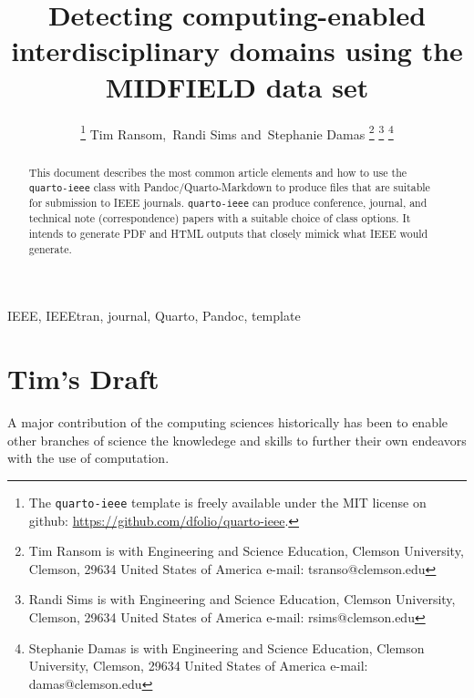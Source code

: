 \documentclass[
  journal,
]{IEEEtran}%
\title{Detecting computing-enabled interdisciplinary domains using the
MIDFIELD data set}
\author{
\thanks{The \texttt{quarto-ieee} template is freely available under the
MIT license on github: \url{https://github.com/dfolio/quarto-ieee}.}
Tim Ransom\orcidlink{0000-0003-0357-5427},~Randi
Sims\orcidlink{0000-0003-0357-5427}
and~Stephanie Damas\orcidlink{0000-0003-0357-5427}%
\thanks{Tim Ransom is with Engineering and Science Education, Clemson
University, Clemson, 29634 United States of America%
 e-mail: tsranso@clemson.edu}
\thanks{Randi Sims is with Engineering and Science Education, Clemson
University, Clemson, 29634 United States of America%
 e-mail: rsims@clemson.edu}
\thanks{Stephanie Damas is with Engineering and Science
Education, Clemson University, Clemson, 29634 United States of America%
 e-mail: damas@clemson.edu}
}
\begin{document}


\maketitle

\begin{abstract}
This document describes the most common article elements and how to use
the \texttt{quarto-ieee} class with Pandoc/Quarto-Markdown to produce
files that are suitable for submission to IEEE journals.
\texttt{quarto-ieee} can produce conference, journal, and technical note
(correspondence) papers with a suitable choice of class options. It
intends to generate PDF and HTML outputs that closely mimick what IEEE
would generate.
\end{abstract}
\begin{IEEEkeywords}
IEEE, IEEEtran, journal, Quarto, Pandoc, template
\end{IEEEkeywords}

%

\ifdefined\Shaded\renewenvironment{Shaded}{\begin{tcolorbox}[enhanced, sharp corners, frame hidden, borderline west={3pt}{0pt}{shadecolor}, boxrule=0pt, breakable, interior hidden]}{\end{tcolorbox}}\fi

\hypertarget{tims-draft}{%
\section{Tim's Draft}\label{tims-draft}}

A major contribution of the computing sciences historically has been to
enable other branches of science the knowledege and skills to further
their own endeavors with the use of computation.
\end{document}
